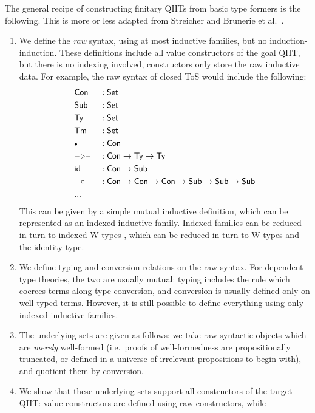 \documentclass[12pt,a4paper,twoside,openany]{book}
\theoremstyle{remark}
\theoremstyle{definition}
\theoremstyle{theorem}
\newcommand{\id}{\mathsf{id}}
\newcommand{\Con}{\mathsf{Con}}
\newcommand{\Sub}{\mathsf{Sub}}
\newcommand{\Tm}{\mathsf{Tm}}
\newcommand{\Ty}{\mathsf{Ty}}
\newcommand{\blank}{\mathord{\hspace{1pt}\text{--}\hspace{1pt}}}
\newcommand{\Set}{\mathsf{Set}}
\newcommand{\ext}{\triangleright}
\newcommand{\emptycon}{\scaleobj{.75}\bullet}
\begin{document}
The general recipe of constructing finitary QIITs from basic type formers is the
following. This is more or less adapted from Streicher \cite{streicher93habil}
and Brunerie et al.\ \cite{brunerie}.
\begin{enumerate}
  \item
    We define the \emph{raw} syntax, using at most inductive families, but
    no induction-induction. These definitions include all value constructors of
    the goal QIIT, but there is no indexing involved, constructors only store
    the raw inductive data. For example, the raw syntax of closed ToS would
    include the following:
    \begin{alignat*}{3}
      & \Con &&: \Set \\
      & \Sub &&: \Set \\
      & \Ty  &&: \Set \\
      & \Tm  &&: \Set \\
      & \emptycon &&: \Con \\
      & \blank\!\ext\!\blank &&: \Con \to \Ty \to \Ty \\
      & \id &&: \Con \to \Sub \\
      & \blank\!\circ\!\blank &&: \Con \to \Con \to \Con \to \Sub \to \Sub \to \Sub\\
      & ... &&
    \end{alignat*}
    This can be given by a simple mutual inductive definition, which can be
    represented as an indexed inductive family. Indexed families can be
    reduced in turn to indexed W-types \cite{mutualinductive}, which can be
    reduced in turn to W-types and the identity type.
  \item
    We define typing and conversion relations on the raw syntax. For dependent
    type theories, the two are usually mutual: typing includes the rule which
    coerces terms along type conversion, and conversion is usually defined only
    on well-typed terms.  However, it is still possible to define everything
    using only indexed inductive families.
  \item
    The underlying sets are given as follows: we take raw syntactic objects
    which are \emph{merely} well-formed (i.e.\ proofs of well-formedness are
    propositionally truncated, or defined in a universe of irrelevant
    propositions to begin with), and quotient them by conversion.
  \item
    We show that these underlying sets support all constructors of the target
    QIIT: value constructors are defined using raw constructors, while

\end{enumerate}
\end{document}
